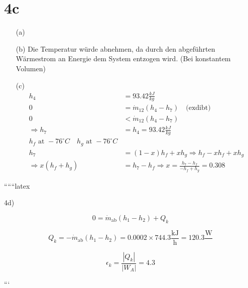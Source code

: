 \section*{4c}

\begin{itemize}
    \item[(a)] 
\end{itemize}

\begin{itemize}
    \item[(b)] Die Temperatur würde abnehmen, da durch den abgeführten Wärmestrom an Energie dem System entzogen wird. (Bei konstantem Volumen)
\end{itemize}

\begin{itemize}
    \item[(c)] 
    \begin{align*}
        h_4 &= 93.42 \frac{kJ}{kg} \\
        0 &= \dot{m}_{12} (h_4 - h_7) \quad \text{(exdibt)} \\
        0 &< \dot{m}_{12} (h_4 - h_7) \\
        \Rightarrow h_7 &= h_4 = 93.42 \frac{kJ}{kg} \\
        h_{f} \text{ at } -76^\circ C \quad h_{g} \text{ at } -76^\circ C \\
        h_7 &= (1 - x) h_f + x h_g \Rightarrow h_f - x h_f + x h_g \\
        \Rightarrow x (h_f + h_g) &= h_7 - h_f \Rightarrow x = \frac{h_7 - h_f}{-h_f + h_g} = 0.308
    \end{align*}
\end{itemize}

``````latex

4d)

\[
0 = \dot{m}_{\text{ab}} (h_1 - h_2) + Q_k
\]

\[
Q_k = -\dot{m}_{\text{ab}} (h_1 - h_2) = 0.0002 \times 744.3 \frac{\text{kJ}}{\text{h}} = 120.3 \frac{\text{W}}{}
\]

\[
\epsilon_k = \frac{|Q_k|}{|W_A|} = 4.3
\]

```